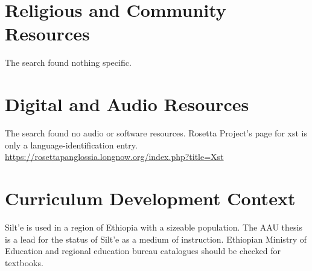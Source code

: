 \documentclass[12pt]{article}
\begin{document}
\section{Religious and Community Resources}
The search found nothing specific.

\section{Digital and Audio Resources}
The search found no audio or software resources. Rosetta Project's page for xst is only a language-identification entry. \url{https://rosettapanglossia.longnow.org/index.php?title=Xst}

\section{Curriculum Development Context}
Silt'e is used in a region of Ethiopia with a sizeable population. The AAU thesis is a lead for the status of Silt'e as a medium of instruction. Ethiopian Ministry of Education and regional education bureau catalogues should be checked for textbooks.
\end{document}
